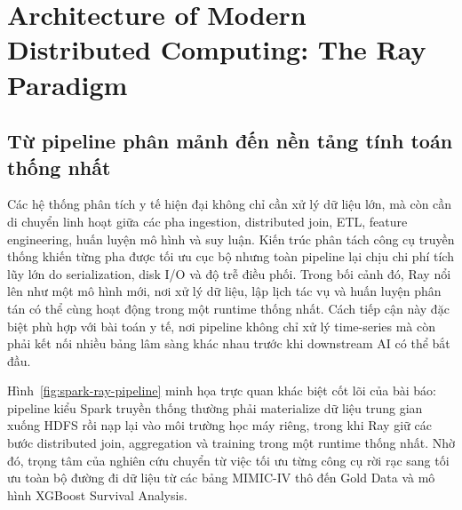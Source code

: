 \section{Architecture of Modern Distributed Computing: The Ray Paradigm}

\subsection{Từ pipeline phân mảnh đến nền tảng tính toán thống nhất}
Các hệ thống phân tích y tế hiện đại không chỉ cần xử lý dữ liệu lớn, mà còn cần di chuyển linh hoạt giữa các pha ingestion, distributed join, ETL, feature engineering, huấn luyện mô hình và suy luận. Kiến trúc phân tách công cụ truyền thống khiến từng pha được tối ưu cục bộ nhưng toàn pipeline lại chịu chi phí tích lũy lớn do serialization, disk I/O và độ trễ điều phối. Trong bối cảnh đó, Ray nổi lên như một mô hình mới, nơi xử lý dữ liệu, lập lịch tác vụ và huấn luyện phân tán có thể cùng hoạt động trong một runtime thống nhất. Cách tiếp cận này đặc biệt phù hợp với bài toán y tế, nơi pipeline không chỉ xử lý time-series mà còn phải kết nối nhiều bảng lâm sàng khác nhau trước khi downstream AI có thể bắt đầu.

Hình~\ref{fig:spark-ray-pipeline} minh họa trực quan khác biệt cốt lõi của bài báo: pipeline kiểu Spark truyền thống thường phải materialize dữ liệu trung gian xuống HDFS rồi nạp lại vào môi trường học máy riêng, trong khi Ray giữ các bước distributed join, aggregation và training trong một runtime thống nhất. Nhờ đó, trọng tâm của nghiên cứu chuyển từ việc tối ưu từng công cụ rời rạc sang tối ưu toàn bộ đường đi dữ liệu từ các bảng MIMIC-IV thô đến Gold Data và mô hình XGBoost Survival Analysis.

